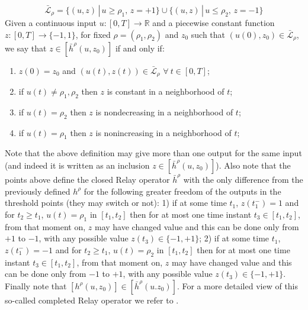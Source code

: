 \documentclass[12pt]{article}
\newcommand{\R}{\mathbb{R}}
\newcommand{\LL}{\mathcal{L}}
\newcommand{\p}{\rho}
\newcommand{\1}{\mathds{1}}
\theoremstyle{definition}
\begin{document}
\[
\bar{\LL}_\p=\{ (u,z)\,|\,u \geq \p_1,\, z= +1\} \cup \{(u,z)\,|\, u \leq \p_2,\, z= -1\}
\]
Given a continuous input $u:[0,T]\to \R$ and a piecewise constant function $z: [0,T]\to \{-1,1\}$, for fixed $\p=(\p_1,\p_2)$ and $z_0$ such that $(u(0),z_0)\in \bar{\LL}_\p$, we say that $z \in [\bar{h}^\p(u, z_0)]$ if and only if:
    \begin{enumerate}
        \item $z(0)=z_0$ and $(u(t),z(t))\in \bar{\LL}_\p$ $\forall\ t\in[0,T]$;
        \item if $u(t)\not=\p_1,\p_2$ then $z$ is constant in a neighborhood of $t$;
        \item if $u(t)=\p_2$ then $z$ is nondecreasing in a neighborhood of $t$;
        \item if $u(t)=\p_1$ then $z$ is nonincreasing in a neighborhood of $t$;
    \end{enumerate}
Note that the above definition may give more than one output for the same input (and indeed it is written as an inclusion $z \in [\bar{h}^\p(u, z_0)]$).
Also note that the points above define the closed Relay operator $\bar{h}^\p$ with the only difference from the previously defined $h^\p$ for the following greater freedom of the outputs in the threshold points (they may switch or not): 1) if at some time $t_1$, $z(t_1^-)=1$ and for $t_2\ge t_1$, $u(t)=\p_1$ in $[t_1,t_2]$ then for at most one time instant $t_3\in [t_1,t_2]$, from that moment on, $z$ may have changed value and this can be done only from $+1$ to $-1$, with any possible value $z(t_3)\in \{-1,+1\}$; 2) if at some time $t_1$, $z(t_1^-)=-1$ and for $t_2\ge t_1$, $u(t)=\p_2$ in $[t_1,t_2]$ then for at most one time instant $t_3\in [t_1,t_2]$, from that moment on, $z$ may have changed value and this can be done only from $-1$ to $+1$, with any possible value $z(t_3)\in \{-1,+1\}$. Finally note that $[h^\rho(u,z_0)]\in[{\bar h}^\rho(u.z_0)]$. For a more detailed view of this so-called completed Relay operator we refer to \cite[Section~6.1]{AVH}.
\end{document}

